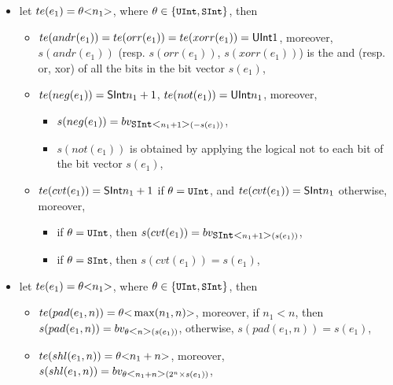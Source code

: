 \begin{itemize}
\begin{itemize}
%
\item $te(dshr(e_1, e_2)) = \theta \bwidth{n_1}$ and $s(dshr(e_1, e_2)) = bv_{\theta \bwidth{n_1}(s(e_1) \div 2^{s(e_2)})}$,
%
\end{itemize}
%
\item let $te(e_1) = \theta \mbox{<} n_1 \mbox{>}$, where $\theta \in \{\mbox{\prettyll{UInt}}, \mbox{\prettyll{SInt}}\}$, then
\begin{itemize}
\item $te(andr(e_1)) = te(orr(e_1)) =  te(xorr(e_1)) = {\sf UInt}{1}$, moreover, $s(andr(e_1))$ (resp. $s(orr(e_1))$, $s(xorr(e_1))$) is the and (resp. or, xor) of all the bits in the bit vector $s(e_1)$,
%
\item $te(neg(e_1)) = {\sf SInt}{n_1 +1}$, $te(not(e_1)) =  {\sf UInt}{n_1}$, moreover,
\begin{itemize}
\item $s(neg(e_1)) = bv_{\mbox{\prettyll{SInt}}\bwidth{n_1+1}(-s(e_1))}$,
%
\item $s(not(e_1))$ is obtained by applying the logical not to each bit of the bit vector $s(e_1)$,
\end{itemize}
%
%
\item $te(cvt(e_1)) = {\sf SInt}{n_1 +1}$ if $\theta = \mbox{\prettyll{UInt}}$, and $te(cvt(e_1)) =  {\sf SInt}{n_1}$ otherwise,  moreover,
\begin{itemize}
\item if $\theta = \mbox{\prettyll{UInt}}$, then $s(cvt(e_1)) = bv_{\mbox{\prettyll{SInt}}\bwidth{n_1+1}(s(e_1))}$,
%
\item if $\theta = \mbox{\prettyll{SInt}}$, then $s(cvt(e_1)) = s(e_1)$,
\end{itemize}
\end{itemize}
%
\item let $te(e_1) = \theta \mbox{<} n_1 \mbox{>}$, where $\theta \in \{\mbox{\prettyll{UInt}}, \mbox{\prettyll{SInt}}\}$, then
\begin{itemize}
\item $te(pad(e_1, n)) = \theta\mbox{<} \max(n_1, n) \mbox{>}$, moreover, if $n_1 < n$, then $s(pad(e_1,n)) = bv_{\theta\mbox{<} n \mbox{>}(s(e_1))}$, otherwise, $s(pad(e_1,n)) = s(e_1)$,
%
\item $te(shl(e_1,n)) = \theta \mbox{<} n_1 + n \mbox{>}$, moreover, $s(shl(e_1,n)) =  bv_{\theta\mbox{<} n_1 + n \mbox{>}(2^{n} \times s(e_1))}$,

\end{itemize}
\end{itemize}
